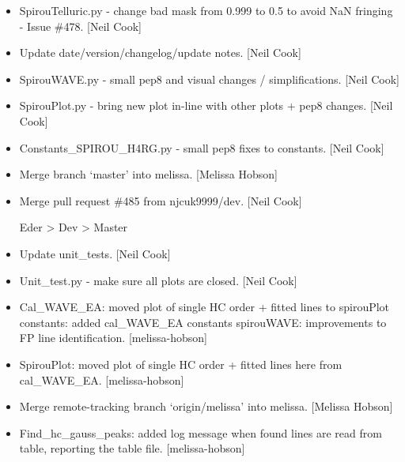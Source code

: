 \documentclass[a4paper,10pt,english]{report}
\begin{document}
\begin{itemize}
\item {} 
SpirouTelluric.py - change bad mask from 0.999 to 0.5 to avoid NaN
fringing - Issue \#478. {[}Neil Cook{]}

\item {} 
Update date/version/changelog/update notes. {[}Neil Cook{]}

\item {} 
SpirouWAVE.py - small pep8 and visual changes / simplifications. {[}Neil
Cook{]}

\item {} 
SpirouPlot.py - bring new plot in-line with other plots + pep8
changes. {[}Neil Cook{]}

\item {} 
Constants\_SPIROU\_H4RG.py - small pep8 fixes to constants. {[}Neil Cook{]}

\item {} 
Merge branch ‘master’ into melissa. {[}Melissa Hobson{]}

\item {} 
Merge pull request \#485 from njcuk9999/dev. {[}Neil Cook{]}

Eder \textendash{}\textgreater{} Dev \textendash{}\textgreater{} Master

\item {} 
Update unit\_tests. {[}Neil Cook{]}

\item {} 
Unit\_test.py - make sure all plots are closed. {[}Neil Cook{]}

\item {} 
Cal\_WAVE\_EA: moved plot of single HC order + fitted lines to
spirouPlot constants: added cal\_WAVE\_EA constants spirouWAVE:
improvements to FP line identification. {[}melissa-hobson{]}

\item {} 
SpirouPlot: moved plot of single HC order + fitted lines here from
cal\_WAVE\_EA. {[}melissa-hobson{]}

\item {} 
Merge remote-tracking branch ‘origin/melissa’ into melissa. {[}Melissa
Hobson{]}

\item {} 
Find\_hc\_gauss\_peaks: added log message when found lines are read from
table, reporting the table file. {[}melissa-hobson{]}

\end{itemize}
\end{document}
